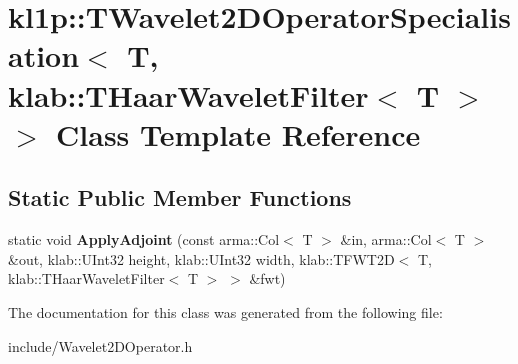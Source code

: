 \hypertarget{classkl1p_1_1TWavelet2DOperatorSpecialisation_3_01T_00_01klab_1_1THaarWaveletFilter_3_01T_01_4_01_4}{}\section{kl1p\+:\+:T\+Wavelet2\+D\+Operator\+Specialisation$<$ T, klab\+:\+:T\+Haar\+Wavelet\+Filter$<$ T $>$ $>$ Class Template Reference}
\label{classkl1p_1_1TWavelet2DOperatorSpecialisation_3_01T_00_01klab_1_1THaarWaveletFilter_3_01T_01_4_01_4}
\subsection*{Static Public Member Functions}
\begin{DoxyCompactItemize}
\item 
static void {\bfseries Apply\+Adjoint} (const arma\+::\+Col$<$ T $>$ \&in, arma\+::\+Col$<$ T $>$ \&out, klab\+::\+U\+Int32 height, klab\+::\+U\+Int32 width, klab\+::\+T\+F\+W\+T2D$<$ T, klab\+::\+T\+Haar\+Wavelet\+Filter$<$ T $>$ $>$ \&fwt)\hypertarget{classkl1p_1_1TWavelet2DOperatorSpecialisation_3_01T_00_01klab_1_1THaarWaveletFilter_3_01T_01_4_01_4_a99eb307cbabff7a239d4d3211b901982}{}\label{classkl1p_1_1TWavelet2DOperatorSpecialisation_3_01T_00_01klab_1_1THaarWaveletFilter_3_01T_01_4_01_4_a99eb307cbabff7a239d4d3211b901982}

\end{DoxyCompactItemize}


The documentation for this class was generated from the following file\+:\begin{DoxyCompactItemize}
\item 
include/Wavelet2\+D\+Operator.\+h\end{DoxyCompactItemize}
